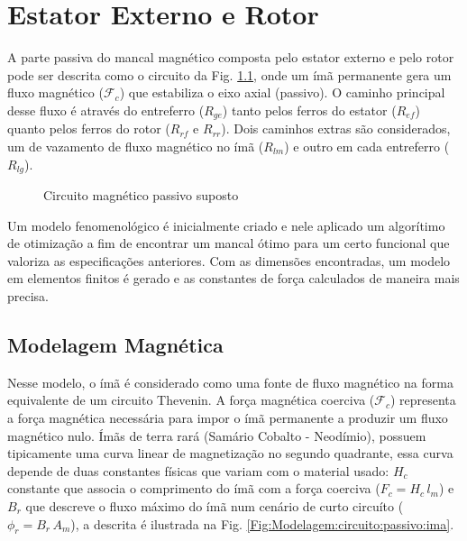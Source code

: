 \pagestyle{empty}
\cleardoublepage
\pagestyle{fancy}


\chapter{Estator Externo e Rotor}

A parte passiva do mancal magnético composta pelo estator externo e pelo rotor  pode ser descrita como o circuito da Fig. \ref{Fig:Modelagem:circuito:passivo:umlado}, onde um ímã permanente gera um fluxo magnético ($\mathcal{F}_c$) que estabiliza o eixo axial (passivo). O caminho principal desse fluxo é através do entreferro ($R_{ge}$) tanto pelos ferros do estator ($R_{ef}$) quanto pelos ferros do rotor ($R_{rf}$ e $R_{rr}$). Dois caminhos extras são considerados, um de vazamento de fluxo magnético no ímã ($R_{lm}$) e outro em cada entreferro ($R_{lg}$). 

\begin{figure}[!ht]
	\centering
	\def\svgwidth{1\columnwidth}
	
	\caption{Circuito magnético passivo suposto}
	\label{Fig:Modelagem:circuito:passivo:umlado}
\end{figure}

Um modelo fenomenológico é inicialmente criado e nele aplicado um algorítimo de otimização a fim de encontrar um mancal ótimo para um certo funcional que valoriza as especificações anteriores. Com as dimensões encontradas, um modelo em elementos finitos é gerado e as constantes de força calculados de maneira mais precisa.

\section{Modelagem Magnética}

Nesse modelo, o ímã é considerado como uma fonte de fluxo magnético na forma equivalente de um circuito Thevenin. A força magnética coerciva ($\mathcal{F}_c$) representa a força magnética necessária para impor o ímã permanente a produzir um fluxo magnético nulo. Ímãs de terra rará (Samário Cobalto - Neodímio), possuem tipicamente uma curva linear de magnetização no segundo quadrante, essa curva depende de duas constantes físicas que variam com o material usado: $H_c$ constante que associa o comprimento do ímã com a força coerciva ($ F_c = H_c \, l_m$) e $B_r$ que descreve o fluxo máximo do ímã num cenário de curto circuíto ($\phi_r = B_r \, A_m$), a descrita é ilustrada na Fig. \ref{Fig:Modelagem:circuito:passivo:ima}.

